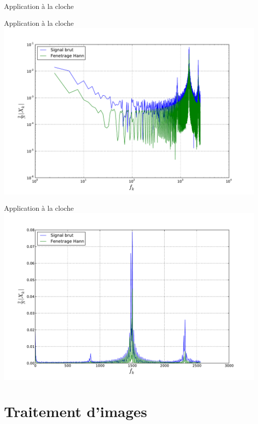 \documentclass[8pt,a4paper]{beamer}
\begin{document}
\begin{frame}{Application à la cloche}

\end{frame}

\begin{frame}{Application à la cloche}
\includegraphics[width=1.\textwidth]{figures/FFT_cloche-log.pdf} \\
\end{frame}

\begin{frame}{Application à la cloche}
\includegraphics[width=1.\textwidth]{figures/FFT_cloche.pdf} \\
\end{frame}

\section{Traitement d'images}
\end{document}
